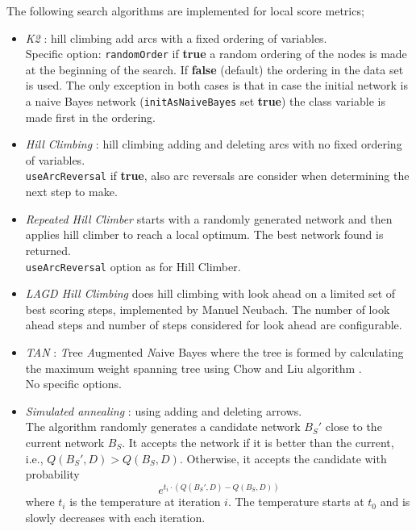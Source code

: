 The following search algorithms are implemented for local score metrics;
\begin{itemize}
\item \textit{K2} \cite{CooperHerskovits1992}: 
hill climbing add arcs with a fixed ordering of variables.\\
Specific option: {\tt randomOrder} if {\bf true} a random ordering of
the nodes is made at the beginning of the search. If {\bf false} (default)
the ordering in the data set is used. The only exception in both cases is that
in case the initial network is a naive Bayes network ({\tt initAsNaiveBayes}
set \textbf{true}) the class variable is made first in the ordering.
\item \textit{Hill Climbing} 
\cite{Buntine1996}: 
hill climbing adding and deleting arcs with no fixed ordering of variables.\\
{\tt useArcReversal} if \textbf{true}, also arc reversals are consider when determining
the next step to make.
\item \textit{Repeated Hill Climber} starts with a randomly generated network and
then applies hill climber to reach a local optimum. The best network found is
returned.\\
{\tt useArcReversal} option as for Hill Climber.
\item \textit{LAGD Hill Climbing} does hill climbing with look ahead on a limited set of 
best scoring steps, implemented by Manuel Neubach. The number of look ahead steps and number of steps considered
for look ahead are configurable.
\item \textit{TAN} \cite{ChengGreiner1999,friedman97}:
\textit{T}ree \textit{A}ugmented \textit{N}aive Bayes where the tree is formed by calculating the
maximum weight spanning tree using Chow and Liu algorithm \cite{chow1968}.\\
No specific options.
\item \textit{Simulated annealing} \cite{bouck1995}:
using adding and deleting arrows.\\
The algorithm randomly generates a candidate network $B_S'$ close to the current
network $B_S$. It accepts the network if it is better than the current, i.e.,
$Q(B_S',D) > Q(B_S,D)$. 
Otherwise, it accepts the candidate with probability 
$$e^{t_i \cdot(Q(B_S',D) -Q(B_S,D))}$$
where $t_i$ is the temperature at iteration $i$.
The temperature starts at $t_0$ and is slowly decreases with each iteration. 

\begin{center}
\end{center}


\end{itemize}
